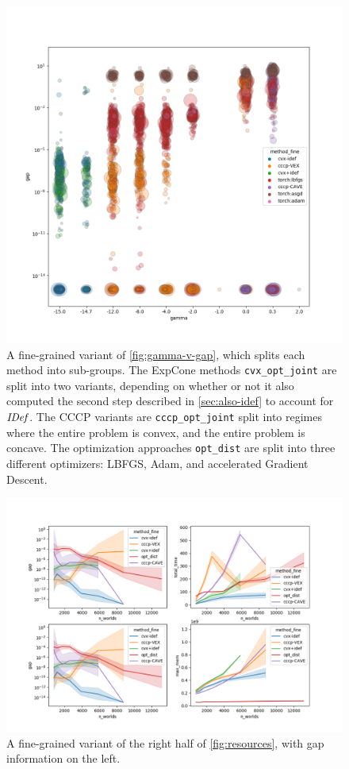 \documentclass[twoside]{article}
\begin{document}
\begin{figure}
    \includegraphics[width=\linewidth]{figs/2}
    \caption{
        A fine-grained variant of \cref{fig:gamma-v-gap}, which splits each method into sub-groups.
        The ExpCone methods \texttt{cvx\_opt\_joint} are split into two variants, depending on whether or not it also computed the second step described in \cref{sec:also-idef} to account for $\mathit{IDef}_{\!}$.
        The CCCP variants are \texttt{cccp\_opt\_joint} split into regimes where the entire problem is convex, and the entire problem is concave. The optimization approaches \texttt{opt\_dist} are split into three different optimizers: LBFGS, Adam, and accelerated Gradient Descent.
    }\label{fig:gamma-v-gap-fine}
\end{figure}

\begin{figure}
    \includegraphics[width=\linewidth]{figs/1}
    \caption{
        A fine-grained variant of the right half of \cref{fig:resources},
        with gap information on the left.
    }\label{fig:gap-resource-fine}
\end{figure}
\end{document}
